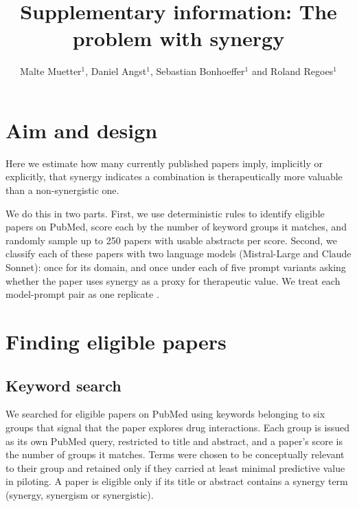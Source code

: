 \documentclass[openacc]{rstb}
\begin{document}
\title{Supplementary information: The problem with synergy}

\author{Malte Muetter$^{1}$, Daniel Angst$^{1}$, Sebastian Bonhoeffer$^{1}$ and Roland Regoes$^{1}$}

\address{$^{1}$Department of Environmental Systems Science, ETH Z\"urich,
Universit\"atstrasse 16, 8092 Z\"urich, Switzerland}


\maketitle
\clearpage

\section{Aim and design}
Here we estimate how many currently published papers imply, implicitly or explicitly, that synergy indicates a combination is therapeutically more valuable than a non-synergistic one.

We do this in two parts.
First, we use deterministic rules to identify eligible papers on PubMed, score each by the number of keyword groups it matches, and randomly sample up to 250 papers with usable abstracts per score.
Second, we classify each of these papers with two language models (Mistral-Large and Claude Sonnet): once for its domain, and once under each of five prompt variants asking whether the paper uses synergy as a proxy for therapeutic value.
We treat each model-prompt pair as one replicate \cite{Dewar2026}.

\section{Finding eligible papers}
\subsection{Keyword search}
We searched for eligible papers on PubMed using keywords belonging to six groups that signal that the paper explores drug interactions.
Each group is issued as its own PubMed query, restricted to title and abstract, and a paper's score is the number of groups it matches.
Terms were chosen to be conceptually relevant to their group and retained only if they carried at least minimal predictive value in piloting.
A paper is eligible only if its title or abstract contains a synergy term (synergy, synergism or synergistic).
\end{document}

